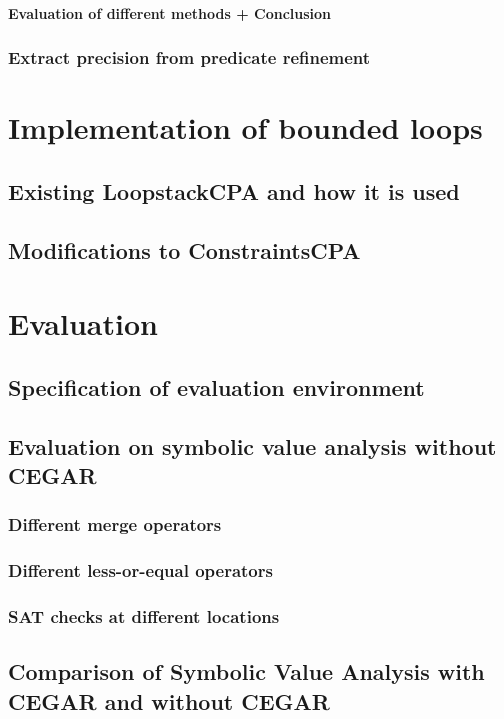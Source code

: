 \documentclass[a4paper,11pt]{article}
\begin{document}
\paragraph{Evaluation of different methods + Conclusion}
\subsubsection{Extract precision from predicate refinement}


\section{Implementation of bounded loops}
\subsection{Existing LoopstackCPA and how it is used}
\subsection{Modifications to ConstraintsCPA}

\section{Evaluation}

\subsection{Specification of evaluation environment}

\subsection{Evaluation on symbolic value analysis without CEGAR}
\subsubsection{Different merge operators}
\subsubsection{Different less-or-equal operators}
\subsubsection{SAT checks at different locations}

\subsection{Comparison of Symbolic Value Analysis with CEGAR and without CEGAR}
\end{document}
